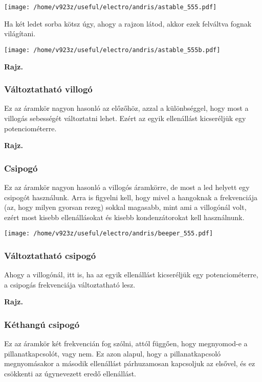 \documentclass[16pt]{scrreprt}
\begin{document}
\texttt{[image: /home/v923z/useful/electro/andris/astable\_555.pdf]}

Ha két ledet sorba kötsz úgy, ahogy a rajzon látod, akkor ezek felváltva fognak világítani.

\texttt{[image: /home/v923z/useful/electro/andris/astable\_555b.pdf]}

\textbf{Rajz.}

\subsubsection{Változtatható villogó}

Ez az áramkör nagyon hasonló az előzőhöz, azzal a különbséggel, hogy most a villogás sebességét változtatni lehet. Ezért az egyik ellenállást kicseréljük egy potenciométerre.

\textbf{Rajz.}

\subsubsection{Csipogó}

Ez az áramkör nagyon hasonló a villogós áramkörre, de most a led helyett egy csipogót használunk. Arra is figyelni kell, hogy mivel a hangoknak a frekvenciája (az, hogy milyen gyorsan rezeg) sokkal magasabb, mint ami a villogónál volt, ezért most kisebb ellenállásokat és kisebb kondenzátorokat kell használnunk. 

\texttt{[image: /home/v923z/useful/electro/andris/beeper\_555.pdf]}

\subsubsection{Változtatható csipogó}

Ahogy a villogónál, itt is, ha az egyik ellenállást kicseréljük egy potenciométerre, a csipogás frekvenciája változtatható lesz. 

\textbf{Rajz.}

\subsubsection{Kéthangú csipogó}

Ez az áramkör két frekvencián fog szólni, attól függően, hogy megnyomod-e a pillanatkapcsolót, vagy nem. Ez azon alapul, hogy a pillanatkapcsoló megnyomásakor a második ellenállást párhuzamosan kapcsoljuk az elsővel, és ez csökkenti az úgynevezett eredő ellenállást.
\end{document}
